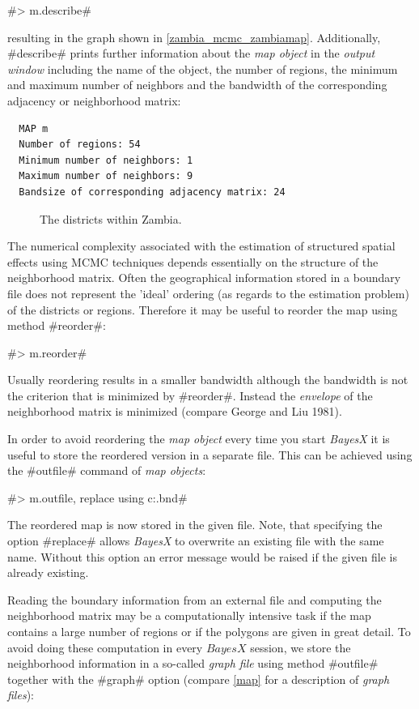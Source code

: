 #> m.describe#

resulting in the graph shown in \autoref{zambia_mcmc_zambiamap}.
Additionally, #describe# prints further information about the {\it
map object} in the {\it output window} including the name of the
object, the number of regions, the minimum and maximum number of
neighbors and the bandwidth of the corresponding adjacency or
neighborhood matrix:

\begin{verbatim}
  MAP m
  Number of regions: 54
  Minimum number of neighbors: 1
  Maximum number of neighbors: 9
  Bandsize of corresponding adjacency matrix: 24
\end{verbatim}

\begin{figure}[ht]
\begin{center}
 {\it\caption{The
districts within Zambia.\label{zambia_mcmc_zambiamap}}}
\end{center}
\end{figure}


The numerical complexity associated with the estimation of
structured spatial effects using MCMC techniques depends
essentially on the structure of the neighborhood matrix. Often the
geographical information stored in a boundary file does not
represent the 'ideal' ordering (as regards to the estimation
problem) of the districts or regions. Therefore it may be useful
to reorder the map using method #reorder#:

#> m.reorder#

Usually reordering results in a smaller bandwidth although the
bandwidth is not the criterion that is minimized by #reorder#.
Instead the {\it envelope} of the neighborhood matrix is minimized
(compare George and Liu 1981).

In order to avoid reordering the {\it map object} every time you
start {\it BayesX} it is useful to store the reordered version in
a separate file. This can be achieved using the #outfile# command
of {\it map objects}:

#> m.outfile, replace using c:\data\zambiasort.bnd#

The reordered map is now stored in the given file. Note, that
specifying the option #replace# allows {\it BayesX} to overwrite
an existing file with the same name. Without this option an error
message would be raised if the given file is already existing.

Reading the boundary information from an external file and
computing the neighborhood matrix may be a computationally
intensive task if the map contains a large number of regions or if
the polygons are given in great detail. To avoid doing these
computation in every $BayesX$ session, we store the neighborhood
information in a so-called {\it graph file} using method #outfile#
together with the #graph# option (compare \autoref{map} for a
description of {\em graph files}):

